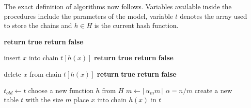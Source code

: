 The exact definition of algorithms now follows. 
Variables available inside the procedures include the parameters of the model, variable $t$ denotes the array used to store the chains and $h \in H$ is the current hash function.

\begin{algorithmic}
		\State \textbf{return} \textbf{true} 
	\Else
		\State \textbf{return} \textbf{false} 
	\EndIf
\EndProcedure
\State
\end{algorithmic}
\begin{algorithmic}
		\State insert $x$ into chain $t[h(x)]$
			\State {}
		\EndIf
		\State \textbf{return} \textbf{true} 
	\Else
		\State \textbf{return} \textbf{false} 
	\EndIf
\EndProcedure
\end{algorithmic}
\begin{algorithmic}
		\State delete $x$ from chain $t[h(x)]$
			\State {}
		\EndIf
		\State \textbf{return} \textbf{true} 
	\Else
		\State \textbf{return} \textbf{false} 
	\EndIf
\EndProcedure
\end{algorithmic}
\begin{algorithmic}
	\State $t_{old} \leftarrow t$
	\State choose a new function $h$ from $H$
		\State $m \leftarrow \lceil\alpha_m m\rceil$
		\State $\alpha = n / m$
	\EndIf
	\Repeat
	\State create a new table $t$ with the size $m$
		\State place $x$ into chain $h(x)$ in $t$
	\EndFor
\EndProcedure
\end{algorithmic}
